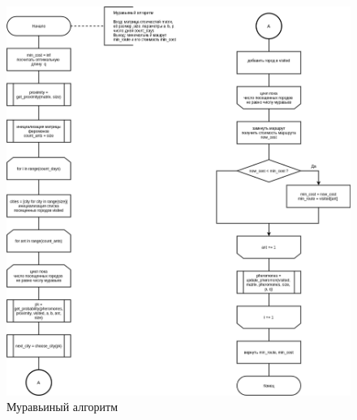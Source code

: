 \begin{figure}[!h]
	\centering
	\includegraphics[scale=0.4]{images/ant.png}
	\caption{Муравьиный алгоритм}
	\label{img:ant}
\end{figure}

